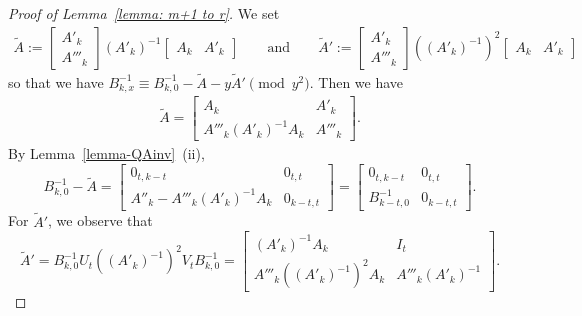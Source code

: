 \documentclass[11pt]{amsart}
\theoremstyle{definition}
\numberwithin{equation}{subsection}
\theoremstyle{plain}
\theoremstyle{plain}
\theoremstyle{plain}
\theoremstyle{plain}
\theoremstyle{plain}
\theoremstyle{plain}
\theoremstyle{plain}
\theoremstyle{plain}
\theoremstyle{plain}
\theoremstyle{plain}
\theoremstyle{plain}
\theoremstyle{plain}
\theoremstyle{definition}
\theoremstyle{definition}
\theoremstyle{definition}
\theoremstyle{remark}
\renewcommand{\(}{\textup{(}}
\renewcommand{\)}{\textup{)}}
\begin{document}
\begin{proof}[Proof of Lemma~\ref{lemma: m+1 to r}]
We set
    \begin{align*}
        \tilde A
        :=
        \begin{bmatrix}
            A'_k \\
            A'''_k
        \end{bmatrix}
        (A'_k)^{-1}
        \begin{bmatrix}
            A_k & A'_k
        \end{bmatrix}
        \qquad\mbox{and}\qquad
        \tilde A'
        :=
        \begin{bmatrix}
            A'_k \\
            A'''_k
        \end{bmatrix}
        ((A'_k)^{-1})^2
        \begin{bmatrix}
            A_k & A'_k
        \end{bmatrix}
    \end{align*}
so that we have $B_{k,x}^{-1}\equiv B_{k,0}^{-1}-\tilde A-y\tilde A' \pmod{y^2}$. Then we have
    \begin{align*}
        \tilde A
        =
        \begin{bmatrix}
            A_k & A'_k \\
            A'''_k(A'_k)^{-1}A_k & A'''_k
        \end{bmatrix}.
    \end{align*}
By Lemma~\ref{lemma-QAinv}~(ii),
    \begin{equation}\label{eq: inverse of B_k,x-tilde A}
        B_{k,0}^{-1}-\tilde A
        =
        \begin{bmatrix}
            0_{t,k-t} & 0_{t,t} \\
            A''_k-A'''_k(A'_k)^{-1}A_k & 0_{k-t,t}
        \end{bmatrix}
        =
        \begin{bmatrix}
            0_{t,k-t} & 0_{t,t} \\
            B_{k-t,0}^{-1} & 0_{k-t,t}
        \end{bmatrix}.
    \end{equation}
For $\tilde A'$, we observe that
    \begin{equation}\label{eq: tilde A prime}
        \tilde A'
        =B_{k,0}^{-1}U_t((A'_k)^{-1})^2V_tB_{k,0}^{-1}=
        \begin{bmatrix}
            (A'_k)^{-1}A_k & I_t \\
            A'''_k((A'_k)^{-1})^2A_k & A'''_k(A'_k)^{-1}
        \end{bmatrix}.

\end{equation}
\end{proof}
\end{document}
